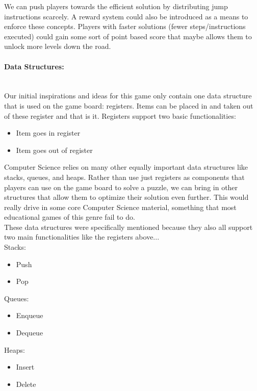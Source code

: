 We can push players towards the efficient solution by distributing jump instructions scarcely.
A reward system could also be introduced as a means to enforce these concepts. Players with
faster solutions (fewer steps/instructions executed) could gain some sort of point based
score that maybe allows them to unlock more levels down the road.\\

\paragraph{Data Structures:} ~\\
Our initial inspirations and ideas for this game only contain one data structure that is
used on the game board: registers. Items can be placed in and taken out of these register and that
is it. Registers support two basic functionalities:
\begin{itemize}
  \item Item goes in register
  \item Item goes out of register
\end{itemize}

Computer Science relies on many other equally important data structures like stacks,
queues, and heaps. Rather than use just registers as components that players can use on
the game board to solve a puzzle, we can bring in other structures that allow them to
optimize their solution even further. This would really drive in some core Computer Science
material, something that most educational games of this genre fail to do.\\

These data structures were specifically mentioned because they also
all support two main functionalities like the registers above...\\

Stacks:
\begin{itemize}
  \item Push
  \item Pop
\end{itemize}

Queues:
\begin{itemize}
  \item Enqueue
  \item Dequeue
\end{itemize}

Heaps:
\begin{itemize}
  \item Insert
  \item Delete
\end{itemize}

